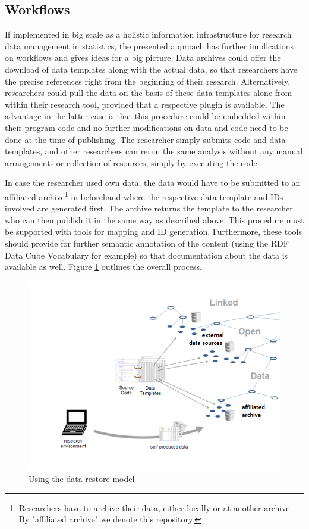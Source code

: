 \documentclass{acm_proc_article-sp}
\begin{document}
\subsection{Workflows}


If implemented in big scale as a holistic information infrastructure for research data management in statistics, the presented approach has further implications on workflows and gives ideas for a big picture.
Data archives could offer the download of data templates along with the actual data, so that researchers have the precise references right from the beginning of their research.
Alternatively, researchers could pull the data on the basis of these data templates alone from within their research tool, provided that a respective plugin is available.
The advantage in the latter case is that this procedure could be embedded within their program code and no further modifications on data and code need to be done at the time of publishing.
The researcher simply submits code and data templates, and other researchers can rerun the same analysis without any manual arrangements or collection of resources, simply by executing the code.


In case the researcher used own data, the data would have to be submitted to an affiliated archive\footnote{Researchers have to archive their data, either locally or at another archive. By "affiliated archive" we denote this repository.} in beforehand where the respective data template and IDs involved are generated first.
The archive returns the template to the researcher who can then publish it in the same way as described above.
This procedure must be supported with tools for mapping and ID generation.
Furthermore, these tools should provide for further semantic annotation of the content (using the RDF Data Cube Vocabulary for example) so that documentation about the data is available as well.
Figure \ref{fig:modelprocessing} outlines the overall process.




\begin{figure}[htb]
\centering
\includegraphics[width=.48\textwidth]{img/fig-model-processing.png}
\caption{
Using the data restore model
}
\label{fig:modelprocessing}
\end{figure}
\end{document}
